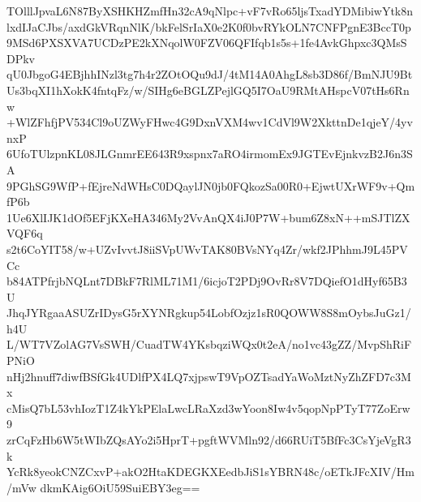 TOlllJpvaL6N87ByXSHKHZmfHn32cA9qNlpc+vF7vRo65ljsTxadYDMibiwYtk8n
lxdIJaCJbs/axdGkVRqnNlK/bkFelSrIaX0e2K0f0bvRYkOLN7CNFPgnE3BccT0p
9MSd6PXSXVA7UCDzPE2kXNqolW0FZV06QFIfqb1s5s+1fe4AvkGhpxc3QMsSDPkv
qU0JbgoG4EBjhhINzl3tg7h4r2ZOtOQu9dJ/4tM14A0AhgL8sb3D86f/BmNJU9Bt
Us3bqXI1hXokK4fntqFz/w/SIHg6eBGLZPejlGQ5I7OaU9RMtAHspcV07tHs6Rnw
+WlZFhfjPV534Cl9oUZWyFHwc4G9DxnVXM4wv1CdVl9W2XkttnDe1qjeY/4yvnxP
6UfoTUlzpnKL08JLGnmrEE643R9xspnx7aRO4irmomEx9JGTEvEjnkvzB2J6n3SA
9PGhSG9WfP+fEjreNdWHsC0DQaylJN0jb0FQkozSa00R0+EjwtUXrWF9v+QmfP6b
1Ue6XlIJK1dOf5EFjKXeHA346My2VvAnQX4iJ0P7W+bum6Z8xN++mSJTlZXVQF6q
s2t6CoYIT58/w+UZvIvvtJ8iiSVpUWvTAK80BVsNYq4Zr/wkf2JPhhmJ9L45PVCc
b84ATPfrjbNQLnt7DBkF7RlML71M1/6icjoT2PDj9OvRr8V7DQiefO1dHyf65B3U
JhqJYRgaaASUZrIDysG5rXYNRgkup54LobfOzjz1sR0QOWW8S8mOybsJuGz1/h4U
L/WT7VZolAG7VsSWH/CuadTW4YKsbqziWQx0t2eA/no1vc43gZZ/MvpShRiFPNiO
nHj2hnuff7diwfBSfGk4UDlfPX4LQ7xjpswT9VpOZTsadYaWoMztNyZhZFD7c3Mx
cMisQ7bL53vhIozT1Z4kYkPElaLwcLRaXzd3wYoon8Iw4v5qopNpPTyT77ZoErw9
zrCqFzHb6W5tWIbZQsAYo2i5HprT+pgftWVMln92/d66RUiT5BfFc3CsYjeVgR3k
YcRk8yeokCNZCxvP+akO2HtaKDEGKXEedbJiS1sYBRN48c/oETkJFcXIV/Hm/mVw
dkmKAig6OiU59SuiEBY3eg==
